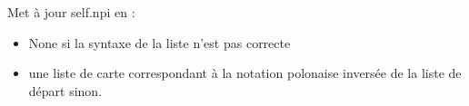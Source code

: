 \documentclass[letterpaper,10pt,french]{sphinxmanual}
\begin{document}
\begin{fulllineitems}
\begin{fulllineitems}
\begin{quote}
\begin{description}
\end{description}\end{quote}

\end{fulllineitems}


\begin{fulllineitems}
\label{\detokenize{doc_classe:cards.CardList.to_npi}}
Met à jour self.npi en :
\begin{itemize}
\item {} 
None si la syntaxe de la liste n’est pas correcte

\item {} 
une liste de carte correspondant à la notation polonaise inversée de
la liste de départ sinon.

\end{itemize}

\end{fulllineitems}


\end{fulllineitems}

\end{document}
